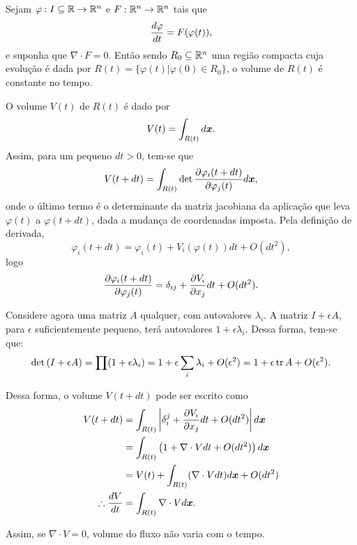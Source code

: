 \begin{lemma}\label{lema:divergente_volume}
    Sejam $\varphi: I \subseteq \mathbb{R} \to \mathbb{R}^n$ e $F: \mathbb{R}^n \to \mathbb{R}^n$ tais que
    \begin{equation*}
        \dfrac{d \varphi}{d t} = F(\varphi(t)),
    \end{equation*}
    e suponha que $\nabla \cdot F = 0$. Então sendo $R_0 \subseteq \mathbb{R}^n$ uma região compacta cuja evolução é dada por $R(t) = \{\varphi(t) | \varphi(0) \in R_0\}$, o volume de $R(t)$ é constante no tempo. 
\end{lemma}
\begin{Proof}
    O volume $V(t)$ de $R(t)$ é dado por
    \begin{equation*}
        V(t) = \int_{R(t)} d\bm x.
    \end{equation*}
    Assim, para um pequeno $dt > 0$, tem-se que
    \begin{equation*}
        V(t+dt) = \int_{R(t)} \det{\dfrac{\partial \varphi_i(t+dt)}{\partial \varphi_j(t)}} d\bm x,
    \end{equation*}
    onde o último termo é o determinante da matriz jacobiana da aplicação que leva $\varphi(t)$ a $\varphi(t+dt)$, dada a mudança de coordenadas imposta. Pela definição de derivada,
    \begin{equation*}
        \varphi_i(t+dt) = \varphi_i(t) + V_i(\varphi(t)) dt + O(dt^2),
    \end{equation*}
    logo
    \begin{equation*}
        \dfrac{\partial \varphi_i(t+dt)}{\partial \varphi_j(t)} = \delta_{ij} + \dfrac{\partial V_i}{\partial x_j} dt + O(dt^2).
    \end{equation*}

    Considere agora uma matriz $A$ qualquer, com autovalores $\lambda_i$. A matriz $I + \epsilon A$, para $\epsilon$ suficientemente pequeno, terá autovalores $1 + \epsilon \lambda_i$. Dessa forma, tem-se que:
    \begin{equation*}
        \det{\left(I + \epsilon A \right)} = \prod (1 + \epsilon \lambda_i) = 1 + \epsilon \sum_i \lambda_i + O(\epsilon^2) = 1 + \epsilon \operatorname{tr} A + O(\epsilon^2).
    \end{equation*}

    Dessa forma, o volume $V(t+dt)$ pode ser escrito como
    \begin{align*}
        V(t+dt) &= \int_{R(t)} \left\lvert \delta_i^j + \dfrac{\partial V_i}{\partial x_j}dt + O(dt^2) \right\rvert d\bm x\\
        &= \int_{R(t)} \left(1 + \nabla \cdot V dt + O(dt^2) \right) d\bm x \\
        &= V(t) + \int_{R(t)} (\nabla \cdot V dt) d\bm x + O(dt^2) \\
        \therefore \dfrac{d V}{d t} &= \int_{R(t)} \nabla \cdot V d\bm x.
    \end{align*}

    Assim, se $\nabla \cdot V = 0$, volume do fluxo não varia com o tempo.    
\end{Proof}


